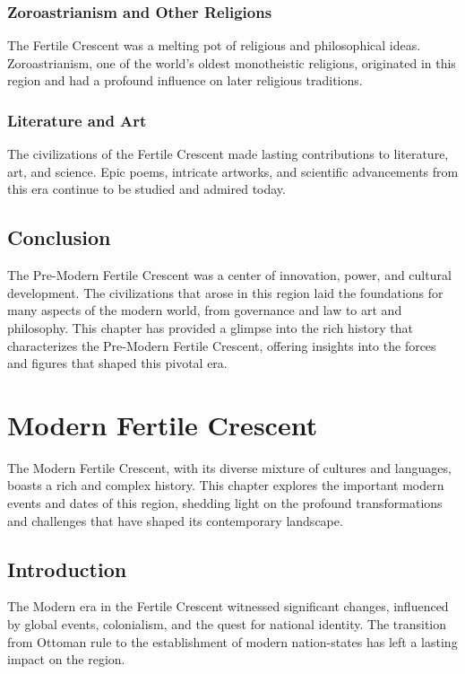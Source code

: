 \documentclass[a4paper,12pt]{book}
\begin{document}
\subsection{Zoroastrianism and Other Religions}
The Fertile Crescent was a melting pot of religious and philosophical ideas. Zoroastrianism, one of the world’s oldest monotheistic religions, originated in this region and had a profound influence on later religious traditions.

\subsection{Literature and Art}
The civilizations of the Fertile Crescent made lasting contributions to literature, art, and science. Epic poems, intricate artworks, and scientific advancements from this era continue to be studied and admired today.

\section{Conclusion}
\label{sec:conclusion-fertile-crescent}

The Pre-Modern Fertile Crescent was a center of innovation, power, and cultural development. The civilizations that arose in this region laid the foundations for many aspects of the modern world, from governance and law to art and philosophy. This chapter has provided a glimpse into the rich history that characterizes the Pre-Modern Fertile Crescent, offering insights into the forces and figures that shaped this pivotal era.

\chapter{Modern Fertile Crescent}
\label{ch:modern-fertile-crescent}

The Modern Fertile Crescent, with its diverse mixture of cultures and languages, boasts a rich and complex history. This chapter explores the important modern events and dates of this region, shedding light on the profound transformations and challenges that have shaped its contemporary landscape.

\section{Introduction}
\label{sec:introduction-modern-fertile-crescent}

The Modern era in the Fertile Crescent witnessed significant changes, influenced by global events, colonialism, and the quest for national identity. The transition from Ottoman rule to the establishment of modern nation-states has left a lasting impact on the region.
\end{document}
